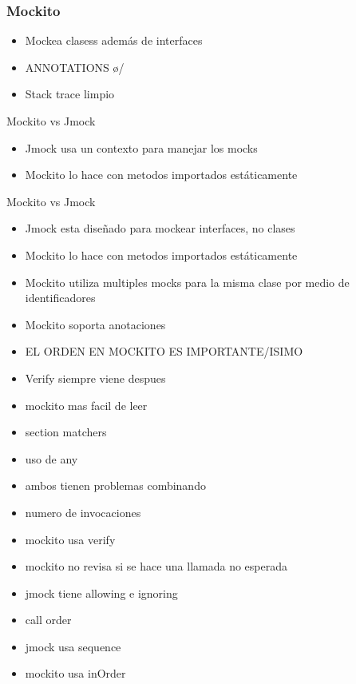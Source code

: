 \documentclass[]{beamer}
\begin{document}
\begin{frame}
  \frametitle{Mockito}
  \begin{itemize}
  \item Mockea clasess además de interfaces
  \item ANNOTATIONS \o/
  \item Stack trace limpio
  \end{itemize}
\end{frame}

\begin{frame}{Mockito vs Jmock}
  \begin{itemize}
  \item Jmock usa un contexto para manejar los mocks
  \item Mockito lo hace con metodos importados estáticamente
  \end{itemize}
\end{frame}

\begin{frame}{Mockito vs Jmock}
  \begin{itemize}
  \item Jmock esta diseñado para mockear interfaces, no clases
  \item Mockito lo hace con metodos importados estáticamente
  \item Mockito utiliza multiples mocks para la misma clase por medio de identificadores
  \item Mockito soporta anotaciones
  \item EL ORDEN EN MOCKITO ES IMPORTANTE/ISIMO
  \item Verify siempre viene despues
  \item mockito mas facil de leer
    \item section matchers
    \item uso de any
    \item ambos tienen problemas combinando
  \item numero de invocaciones
    \item mockito usa verify
    \item mockito no revisa si se hace una llamada no esperada
    \item jmock tiene allowing e ignoring
  \item call order
  \item jmock usa sequence
    \item mockito usa inOrder
  \end{itemize}
  \transboxout
\end{frame}
\end{document}
